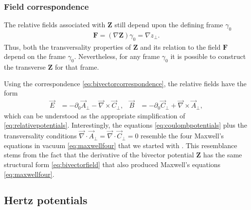 \documentclass[1p,sort&compress]{elsarticle}
\numberwithin{equation}{section}
\newcommand{\rv}[1]{\vec{#1}}
\newcommand{\bv}[1]{\mathbf{#1}}
\begin{document}

\subsubsection{Field correspondence}


The relative fields associated with $\bv{Z}$ still depend upon the defining frame $\gamma_0$
\begin{align}\label{eq:bivectorcorrespondence}
  \bv{F} = (\nabla \bv{Z})\gamma_0 = \nabla z_\perp.
\end{align}
Thus, both the transversality properties of $\bv{Z}$ and its relation to the field $\bv{F}$ depend on the frame $\gamma_0$.  Nevertheless, for any frame $\gamma_0$ it is possible to construct the transverse $\bv{Z}$ for that frame.

Using the correspondence \eqref{eq:bivectorcorrespondence}, the relative fields have the form \cite{Candlin1965,Afanasiev1996,Trueba1996,Cameron2012b}
\begin{align}\label{eq:coulombpotentials}
  \rv{E} &= -\partial_0\rv{A}_\perp - \rv{\nabla}\times\rv{C}_\perp, & \rv{B} &= -\partial_0\rv{C}_\perp + \rv{\nabla}\times\rv{A}_\perp,
\end{align}
which can be understood as the appropriate simplification of \eqref{eq:relativepotentials}.  Interestingly, the equations \eqref{eq:coulombpotentials} plus the transversality conditions $\rv{\nabla}\cdot\rv{A}_\perp = \rv{\nabla}\cdot\rv{C}_\perp = 0$ resemble the four Maxwell's equations in vacuum \eqref{eq:maxwellfour} that we started with \cite{Cameron2012b,VanEnk2013}.  This resemblance stems from the fact that the derivative of the bivector potential $\bv{Z}$ has the same structural form \eqref{eq:bivectorfield} that also produced Maxwell's equations \eqref{eq:maxwellfour}.


\subsection{Hertz potentials}

\end{document}
